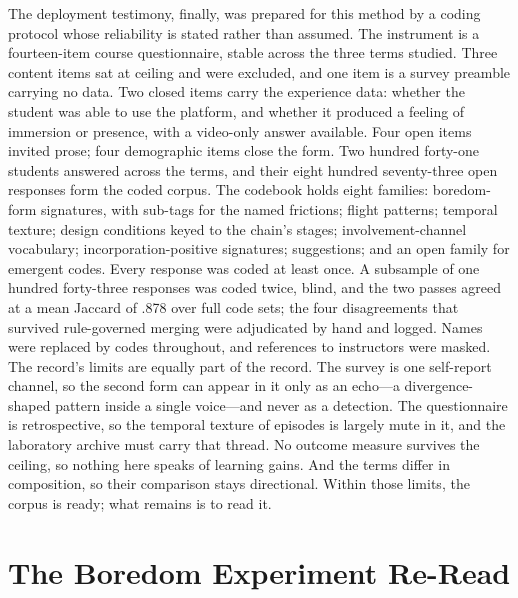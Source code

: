 \documentclass{article}
\begin{document}
The deployment testimony, finally, was prepared for this method by a coding protocol whose reliability is stated rather than assumed. The instrument is a fourteen-item course questionnaire, stable across the three terms studied. Three content items sat at ceiling and were excluded, and one item is a survey preamble carrying no data. Two closed items carry the experience data: whether the student was able to use the platform, and whether it produced a feeling of immersion or presence, with a video-only answer available. Four open items invited prose; four demographic items close the form. Two hundred forty-one students answered across the terms, and their eight hundred seventy-three open responses form the coded corpus. The codebook holds eight families: boredom-form signatures, with sub-tags for the named frictions; flight patterns; temporal texture; design conditions keyed to the chain's stages; involvement-channel vocabulary; incorporation-positive signatures; suggestions; and an open family for emergent codes. Every response was coded at least once. A subsample of one hundred forty-three responses was coded twice, blind, and the two passes agreed at a mean Jaccard of .878 over full code sets; the four disagreements that survived rule-governed merging were adjudicated by hand and logged. Names were replaced by codes throughout, and references to instructors were masked. The record's limits are equally part of the record. The survey is one self-report channel, so the second form can appear in it only as an echo---a divergence-shaped pattern inside a single voice---and never as a detection. The questionnaire is retrospective, so the temporal texture of episodes is largely mute in it, and the laboratory archive must carry that thread. No outcome measure survives the ceiling, so nothing here speaks of learning gains. And the terms differ in composition, so their comparison stays directional. Within those limits, the corpus is ready; what remains is to read it.

\section{The Boredom Experiment Re-Read}
\end{document}
